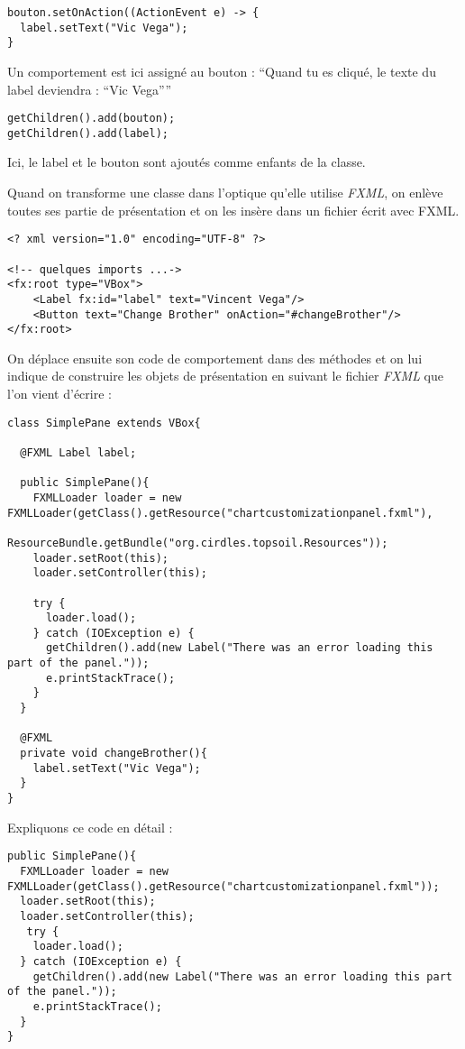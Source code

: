 \begin{verbatim}
bouton.setOnAction((ActionEvent e) -> {
  label.setText("Vic Vega");
}
\end{verbatim}
Un comportement est ici assigné au bouton : ``Quand tu es cliqué, le texte du label deviendra : ``Vic Vega''''

\begin{verbatim}
getChildren().add(bouton);
getChildren().add(label);
\end{verbatim}
Ici, le label et le bouton sont ajoutés comme enfants de la classe.

Quand on transforme une classe dans l'optique qu'elle utilise \textit{FXML}, on enlève toutes ses partie de présentation et on les insère dans un fichier écrit avec FXML.
\begin{verbatim}
<? xml version="1.0" encoding="UTF-8" ?>

<!-- quelques imports ...->
<fx:root type="VBox">
    <Label fx:id="label" text="Vincent Vega"/>
    <Button text="Change Brother" onAction="#changeBrother"/>
</fx:root>
\end{verbatim}

On déplace ensuite son code de comportement dans des méthodes et on lui indique de construire les objets de présentation en suivant le fichier \textit{FXML} que l'on vient d'écrire :
\begin{verbatim}
class SimplePane extends VBox{

  @FXML Label label;

  public SimplePane(){
    FXMLLoader loader = new FXMLLoader(getClass().getResource("chartcustomizationpanel.fxml"),
                                           ResourceBundle.getBundle("org.cirdles.topsoil.Resources"));
    loader.setRoot(this);
    loader.setController(this);

    try {
      loader.load();
    } catch (IOException e) {
      getChildren().add(new Label("There was an error loading this part of the panel."));
      e.printStackTrace();
    }
  }

  @FXML
  private void changeBrother(){
    label.setText("Vic Vega");
  }
}
\end{verbatim}

Expliquons ce code en détail :
\begin{verbatim}
public SimplePane(){
  FXMLLoader loader = new FXMLLoader(getClass().getResource("chartcustomizationpanel.fxml"));
  loader.setRoot(this);
  loader.setController(this);
   try {
    loader.load();
  } catch (IOException e) {
    getChildren().add(new Label("There was an error loading this part of the panel."));
    e.printStackTrace();
  }
}
\end{verbatim}

